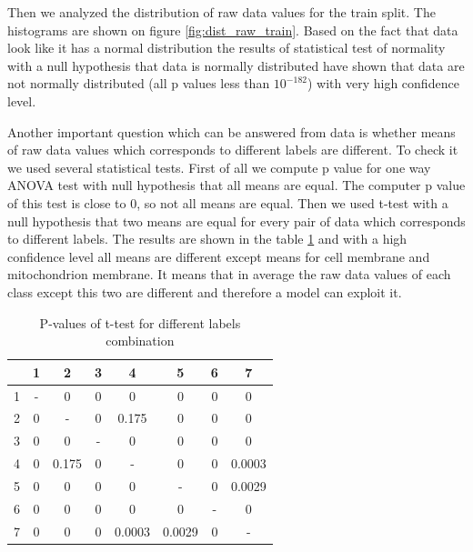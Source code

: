 \documentclass[twocolumn, a4paper]{article}
\theoremstyle{definition}
\begin{document}
Then we analyzed the distribution of raw data values for the train split. The histograms
are shown on figure \ref{fig:dist_raw_train}. Based on the fact that data look like it has
a normal distribution the results of statistical test of normality \cite{normalitytest} with a
null hypothesis that data is normally distributed have shown that data are not normally distributed
(all p values less than \( 10^{-182} \)) with very high confidence level.

Another important question which can be answered from data is whether means of raw data values
which corresponds to different labels are different. To check it we used several statistical tests.
First of all we compute p value for one way ANOVA \cite{lowry2014concepts} test with null hypothesis that all means are equal.
The computer p value of this test is close to 0, so not all means are equal. Then we used t-test \cite{student1908probable}
with a null hypothesis that two means are equal for every pair of data which corresponds to different labels.
The results are shown in the table \ref{tab:data_ttest} and with a high confidence level
all means are different except means for cell membrane and mitochondrion membrane. It means that in average the
raw data values of each class except this two are different and therefore a model can exploit it.

\begin{table}[ht]
    \centering
    \begin{tabular}{c|c|c|c|c|c|c|c}
          & 1 & 2     & 3 & 4      & 5      & 6 & 7      \\
        \hline
        1 & - & 0     & 0 & 0      & 0      & 0 & 0      \\
        \hline
        2 & 0 & -     & 0 & 0.175  & 0      & 0 & 0      \\
        \hline
        3 & 0 & 0     & - & 0      & 0      & 0 & 0      \\
        \hline
        4 & 0 & 0.175 & 0 & -      & 0      & 0 & 0.0003 \\
        \hline
        5 & 0 & 0     & 0 & 0      & -      & 0 & 0.0029 \\
        \hline
        6 & 0 & 0     & 0 & 0      & 0      & - & 0      \\
        \hline
        7 & 0 & 0     & 0 & 0.0003 & 0.0029 & 0 & -      \\
    \end{tabular}
    \caption{P-values of t-test for different labels combination}
    \label{tab:data_ttest}
\end{table}
\end{document}
